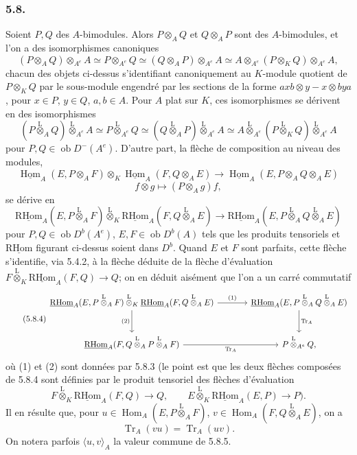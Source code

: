 \documentclass[11pt]{article}
\DeclareMathOperator{\Hom}{Hom}
\newcommand{\R}{\mathrm{R}}\newcommand{\RHomCore}{\mathrm{RHom}}
\newcommand{\ob}{\operatorname{ob}}
\providecommand{\RHom}{\RHomCore}
\providecommand{\uRHom}{\underline{\RHom}}
\providecommand{\uHom}{\underline{\Hom}}
\providecommand{\Tr}{\operatorname{Tr}}
\providecommand{\Tr}{\operatorname{Tr}}
\providecommand{\lten}{\overset{\mathrm L}{\otimes}}
\providecommand{\Tr}{\operatorname{Tr}}
\providecommand{\RHom}{\RHomCore}
\providecommand{\Hom}{\operatorname{Hom}}
\providecommand{\ob}{\operatorname{ob}}
\providecommand{\lten}{\overset{\mathrm L}{\otimes}}
\providecommand{\RHom}{\R\mathcal{H}om}
\providecommand{\lten}{\overset{\mathrm L}{\otimes}}
\providecommand{\R}{\mathrm R}
\providecommand{\Tr}{\operatorname{Tr}}
\providecommand{\lten}{\overset{\mathrm L}{\otimes}}
\providecommand{\lten}{\overset{\mathrm L}{\otimes}}
\providecommand{\lten}{\overset{\mathrm L}{\otimes}}
\providecommand{\RHom}{\RHomCore}
\providecommand{\Hom}{\operatorname{Hom}}
\providecommand{\Tr}{\operatorname{Tr}}
\providecommand{\lten}{\overset{\mathrm L}{\otimes}}
\begin{document}
\subsubsection*{5.8.}

Soient $P,Q$ des $A$-bimodules. Alors $P\otimes_AQ$ et $Q\otimes_AP$ sont des $A$-bimodules, et l'on a des isomorphismes canoniques
\begin{equation}\tag{5.8.1}
(P\otimes_AQ)\otimes_{A^e}A\simeq P\otimes_{A^e}Q\simeq(Q\otimes_AP)\otimes_{A^e}A\simeq A\otimes_{A^e}(P\otimes_KQ)\otimes_{A^e}A,
\end{equation}
chacun des objets ci-dessus s'identifiant canoniquement au $K$-module quotient de $P\otimes_KQ$ par le sous-module engendré par les sections de la forme $axb\otimes y-x\otimes bya$, pour $x\in P$, $y\in Q$, $a,b\in A$. Pour $A$ plat sur $K$, ces isomorphismes se dérivent en des isomorphismes
\begin{equation}\tag{5.8.2}
(P\lten_AQ)\lten_{A^e}A\simeq P\lten_{A^e}Q\simeq(Q\lten_AP)\lten_{A^e}A\simeq A\lten_{A^e}(P\lten_KQ)\lten_{A^e}A
\end{equation}
pour $P,Q\in\ob D^-(A^e)$. D'autre part, la flèche de composition au niveau des modules,
\[
\uHom_A(E,P\otimes_AF)\otimes_K\uHom_A(F,Q\otimes_AE)
\longrightarrow\uHom_A(E,P\otimes_AQ\otimes_AE)
\]
\[
f\otimes g\longmapsto (P\otimes_Ag)f,
\]
se dérive en
\begin{equation}\tag{5.8.3}
\uRHom_A(E,P\lten_AF)\lten_K\uRHom_A(F,Q\lten_AE)
\longrightarrow\uRHom_A(E,P\lten_AQ\lten_AE)
\end{equation}
pour $P,Q\in\ob D^b(A^e)$, $E,F\in\ob D^b(A)$ tels que les produits tensoriels et $\uRHom$ figurant ci-dessus soient dans $D^b$. Quand $E$ et $F$ sont parfaits, cette flèche s'identifie, via 5.4.2, à la flèche déduite de la flèche d'évaluation $F\lten_K\uRHom_A(F,Q)\to Q$; on en déduit aisément que l'on a un carré commutatif
\begin{equation}\tag{5.8.4}
\begin{tikzcd}[column sep=large,row sep=large]
\uRHom_A(E,P\lten_AF)\lten_K\uRHom_A(F,Q\lten_AE) \arrow[r,"(1)"] \arrow[d,"(2)"'] & \uRHom_A(E,P\lten_AQ\lten_AE) \arrow[d,"\Tr_A"]\\
\uRHom_A(F,Q\lten_AP\lten_AF) \arrow[r,"\Tr_A"'] & P\lten_{A^e}Q,
\end{tikzcd}
\end{equation}
où (1) et (2) sont données par 5.8.3 (le point est que les deux flèches composées de 5.8.4 sont définies par le produit tensoriel des flèches d'évaluation
\[
F\lten_K\uRHom_A(F,Q)\longrightarrow Q,\qquad
E\lten_K\uRHom_A(E,P)\longrightarrow P).
\]
Il en résulte que, pour $u\in\Hom_A(E,P\lten_AF)$, $v\in\Hom_A(F,Q\lten_AE)$, on a
\begin{equation}\tag{5.8.5}
\Tr_A(vu)=\Tr_A(uv).
\end{equation}
On notera parfois $\langle u,v\rangle_A$ la valeur commune de 5.8.5.
\end{document}
